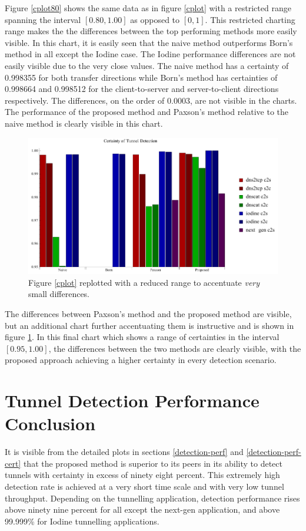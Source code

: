 \documentclass[12pt]{report}
\theoremstyle{remark}
\theoremstyle{definition}
\theoremstyle{definition}
\theoremstyle{definition}
\begin{document}
Figure \ref{cplot80} shows the same data as in figure \ref{cplot} with a
restricted range spanning the interval $[0.80,1.00]$ as opposed to $[0,1]$. This
restricted charting range makes the the differences between the top performing
methods more easily visible. In this chart, it is easily seen that the naive
method outperforms Born's method in all except the Iodine case. The Iodine
performance differences are not easily visible due to the very close values. The
naive method has a certainty of 0.998355 for both transfer directions while
Born's method has certainties of 0.998664 and 0.998512 for the client-to-server
and server-to-client directions respectively. The differences, on the order of
0.0003, are not visible in the charts. The performance of the proposed method
and Paxson's method relative to the naive method is clearly visible in this
chart.

\begin{figure}
\centering
\includegraphics[width=\textwidth]{figures/cplot3.pdf}
\caption[Chart of Certainty of Detection by Tunnel Application and Detection
Method - 0.95 to 1.00]{Figure \ref{cplot} replotted with a reduced range to
accentuate \emph{very} small differences.}
\label{cplot95}
\end{figure}

The differences between Paxson's method and the proposed method are visible, but
an additional chart further accentuating them is instructive and is shown in
figure \ref{cplot95}. In this final chart which shows a range of certainties in
the interval $[0.95,1.00]$, the differences between the two methods are clearly
visible, with the proposed approach achieving a higher certainty in every
detection scenario.

\section{Tunnel Detection Performance Conclusion}
It is visible from the detailed plots in sections \ref{detection-perf} and
\ref{detection-perf-cert} that the proposed method is superior to its peers in
its ability to detect tunnels with certainty in excess of ninety eight percent.
This extremely high detection rate is achieved at a very short time scale and
with very low tunnel throughput. Depending on the tunnelling application,
detection performance rises above ninety nine percent for all except the
next-gen application, and above 99.999\% for Iodine tunnelling applications.
\end{document}

